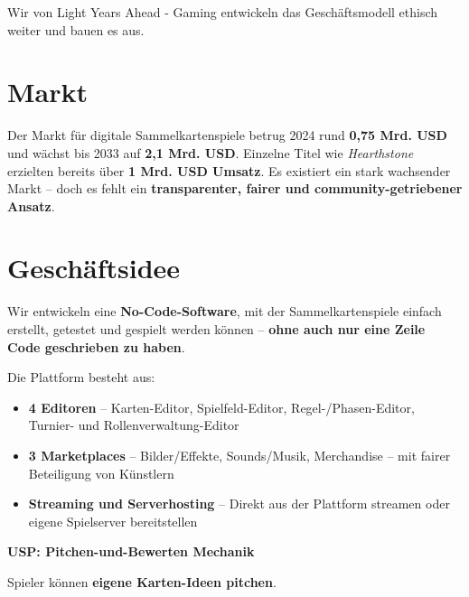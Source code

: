 \documentclass[fontsize=12]{scrartcl}
\begin{document}
	\noindent Wir von Light Years Ahead - Gaming entwickeln das Geschäftsmodell ethisch weiter und bauen es aus.
	
	\section{Markt} \label{sec:Markt}
	
	Der Markt für digitale Sammelkartenspiele betrug 2024 rund \textbf{0,75 Mrd. USD} und wächst bis 2033 auf \textbf{2,1 Mrd. USD}. Einzelne Titel wie \textit{Hearthstone} erzielten bereits über \textbf{1 Mrd. USD Umsatz}. Es existiert ein stark wachsender Markt -- doch es fehlt ein \textbf{transparenter, fairer und community-getriebener Ansatz}.
	
	\section{Geschäftsidee} \label{sec:Geschaeftsidee}
	
	Wir entwickeln eine \textbf{No-Code-Software}, mit der Sammelkartenspiele einfach erstellt, getestet und gespielt werden können -- \textbf{ohne auch nur eine Zeile Code geschrieben zu haben}.\hfill\newline
	
	\noindent Die Plattform besteht aus:
	
	\begin{itemize}
		
		
		\item \textbf{4 Editoren} -- Karten-Editor, Spielfeld-Editor, Regel-/Phasen-Editor, Turnier- und Rollenverwaltung-Editor
		
		\item \textbf{3 Marketplaces} -- Bilder/Effekte, Sounds/Musik, Merchandise -- mit fairer Beteiligung von Künstlern
		
		\item \textbf{Streaming und Serverhosting} -- Direkt aus der Plattform streamen oder eigene Spielserver bereitstellen
		
	\end{itemize}
	
	\noindent \textbf{USP: \glqq Pitchen-und-Bewerten\grqq{} Mechanik}\hfill\newline
	
	\noindent Spieler können \textbf{eigene Karten-Ideen pitchen}.
	
\end{document}
